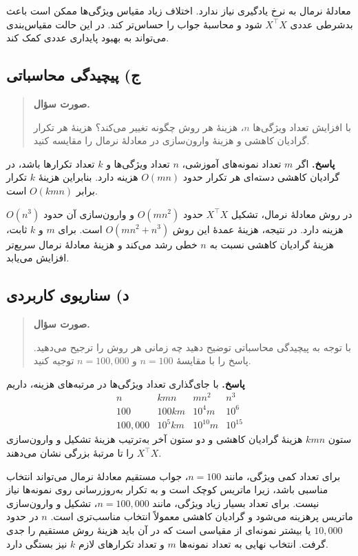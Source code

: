 \documentclass{article}
\numberwithin{equation}{section}
\numberwithin{table}{section}
\newenvironment{questionprompt}{%
    \begin{quote}\noindent\textbf{صورت سؤال.}\enspace\ignorespaces
}{%
    \end{quote}\noindent\textbf{پاسخ.}\enspace\ignorespacesafterend
}
\begin{document}
معادلهٔ نرمال به نرخ یادگیری نیاز ندارد. اختلاف زیاد مقیاس ویژگی‌ها ممکن است باعث بدشرطی عددی \(X^\top X\) شود و محاسبهٔ جواب را حساس‌تر کند. در این حالت مقیاس‌بندی می‌تواند به بهبود پایداری عددی کمک کند.

\subsection*{ج) پیچیدگی محاسباتی}
\begin{questionprompt}
    با افزایش تعداد ویژگی‌ها \(n\)، هزینهٔ هر روش چگونه تغییر می‌کند؟ هزینهٔ هر تکرار گرادیان کاهشی و هزینهٔ وارون‌سازی در معادلهٔ نرمال را مقایسه کنید.
\end{questionprompt}
اگر \(m\) تعداد نمونه‌های آموزشی، \(n\) تعداد ویژگی‌ها و \(k\) تعداد تکرارها باشد، در گرادیان کاهشی دسته‌ای هر تکرار حدود \(O(mn)\) هزینه دارد. بنابراین هزینهٔ \(k\) تکرار برابر \(O(kmn)\) است.

در روش معادلهٔ نرمال، تشکیل \(X^\top X\) حدود \(O(mn^2)\) و وارون‌سازی آن حدود \(O(n^3)\) هزینه دارد. در نتیجه، هزینهٔ عمدهٔ این روش \(O(mn^2+n^3)\) است. برای \(m\) و \(k\) ثابت، هزینهٔ گرادیان کاهشی نسبت به \(n\) خطی رشد می‌کند و هزینهٔ معادلهٔ نرمال سریع‌تر افزایش می‌یابد.

\subsection*{د) سناریوی کاربردی}
\begin{questionprompt}
    با توجه به پیچیدگی محاسباتی توضیح دهید چه زمانی هر روش را ترجیح می‌دهید. پاسخ را با مقایسهٔ \(n=100\) و \(n=100{,}000\) توجیه کنید.
\end{questionprompt}
با جای‌گذاری تعداد ویژگی‌ها در مرتبه‌های هزینه، داریم
\[
    \begin{array}{c|ccc}
        n & kmn & mn^2 & n^3\\ \hline
        100 & 100km & 10^4m & 10^6\\
        100{,}000 & 10^5km & 10^{10}m & 10^{15}
    \end{array}
\]
ستون \(kmn\) هزینهٔ گرادیان کاهشی و دو ستون آخر به‌ترتیب هزینهٔ تشکیل و وارون‌سازی \(X^\top X\) را تا مرتبهٔ بزرگی نشان می‌دهند.

برای تعداد کمی ویژگی، مانند \(n=100\)، جواب مستقیم معادلهٔ نرمال می‌تواند انتخاب مناسبی باشد، زیرا ماتریس کوچک است و به تکرار به‌روزرسانی روی نمونه‌ها نیاز نیست. برای تعداد بسیار زیاد ویژگی، مانند \(n=100{,}000\)، تشکیل و وارون‌سازی ماتریس پرهزینه می‌شود و گرادیان کاهشی معمولاً انتخاب مناسب‌تری است. \(n\) در حدود \(10{,}000\) یا بیشتر نمونه‌ای از مقیاسی است که در آن باید هزینهٔ روش مستقیم را جدی گرفت. انتخاب نهایی به تعداد نمونه‌ها \(m\) و تعداد تکرارهای لازم \(k\) نیز بستگی دارد.
\end{document}

